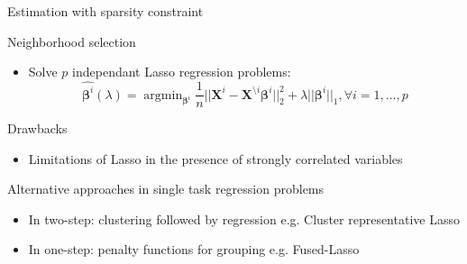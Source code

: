 \documentclass[11pt]{beamer}
\newcommand{\argmin}{\mathop{\mathrm{argmin}}}
\begin{document}
\begin{frame}{Estimation with sparsity constraint}
	
	
	\textcolor{Framaprune}{Neighborhood selection \citep{Meinshausen2006}}
	\begin{itemize}
		\item Solve $p$ independant Lasso regression problems:
		\small $$\hat{\boldsymbol \beta^i}(\lambda) = \argmin_{\boldsymbol \beta^i} \frac{1}{n} || \boldsymbol X^i - \mathbf X^{\setminus i} \boldsymbol \beta^i ||_2^2 + \lambda||\boldsymbol \beta^i||_1, \forall i=1, \dots, p $$
	\end{itemize}
	
	\begin{block}{Drawbacks}
		\begin{itemize}
			\item Limitations of Lasso in the presence of strongly correlated variables 
		\end{itemize}
	\end{block}
	
	\begin{block}{Alternative approaches in single task regression problems}
		\begin{itemize}
			\item In two-step: clustering followed by regression e.g. Cluster representative Lasso \citep{Buhlmann2012}
			\item In one-step: penalty functions for grouping e.g. Fused-Lasso \citep{Tibshirani2005}
		\end{itemize}
	\end{block}
\end{frame}
\end{document}
